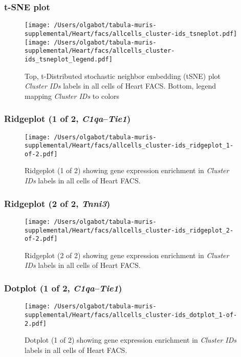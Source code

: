 \clearpage
\subsubsection{t-SNE plot}
\begin{figure}[h]
\centering
\texttt{[image: /Users/olgabot/tabula-muris-supplemental/Heart/facs/allcells\_cluster-ids\_tsneplot.pdf]}
\texttt{[image: /Users/olgabot/tabula-muris-supplemental/Heart/facs/allcells\_cluster-ids\_tsneplot\_legend.pdf]}
\caption{Top, t-Distributed stochastic neighbor embedding (tSNE) plot  \emph{Cluster IDs} labels in all cells of Heart FACS. Bottom, legend mapping \emph{Cluster IDs} to colors}
\end{figure}


\clearpage

\subsubsection{Ridgeplot (1 of 2, \emph{C1qa}--\emph{Tie1})}
\begin{figure}[h]
\centering
\texttt{[image: /Users/olgabot/tabula-muris-supplemental/Heart/facs/allcells\_cluster-ids\_ridgeplot\_1-of-2.pdf]}

\caption{ Ridgeplot (1 of 2)  showing gene expression enrichment in \emph{Cluster IDs} labels in all cells of Heart FACS. }
\end{figure}


\clearpage

\subsubsection{Ridgeplot (2 of 2, \emph{Tnni3})}
\begin{figure}[h]
\centering
\texttt{[image: /Users/olgabot/tabula-muris-supplemental/Heart/facs/allcells\_cluster-ids\_ridgeplot\_2-of-2.pdf]}

\caption{ Ridgeplot (2 of 2)  showing gene expression enrichment in \emph{Cluster IDs} labels in all cells of Heart FACS. }
\end{figure}


\clearpage

\subsubsection{Dotplot (1 of 2, \emph{C1qa}--\emph{Tie1})}
\begin{figure}[h]
\centering
\texttt{[image: /Users/olgabot/tabula-muris-supplemental/Heart/facs/allcells\_cluster-ids\_dotplot\_1-of-2.pdf]}

\caption{ Dotplot (1 of 2)  showing gene expression enrichment in \emph{Cluster IDs} labels in all cells of Heart FACS. }
\end{figure}


